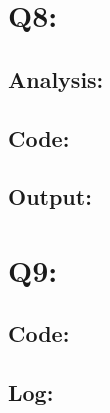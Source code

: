 \documentclass[11pt]{article}
\begin{document}
\section*{Q8:}
\subsection*{Analysis:}

\subsection*{Code:}



\subsection*{Output:}

\section*{Q9:}

\subsection*{Code:}


\subsection*{Log:}


\begin{appendices}\label{appendix}
  
\end{appendices}

\newpage

% 
% 
\end{document}
